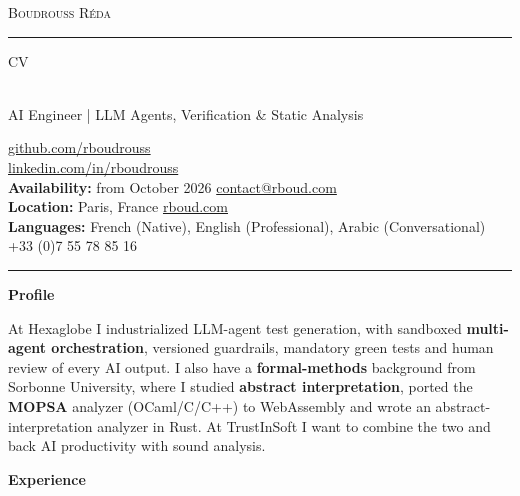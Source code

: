 \documentclass[10pt,A4]{article}
\newcommand{\cvsection}[1]
{
	\begin{center}
		\large\textcolor{sectcol}{\textbf{#1}}
	\end{center}
}
\newcommand{\metasection}[2]
{
\footnotesize{#2} \hspace*{\fill} \footnotesize{#1}\\[1pt]
}
\begin{document}
\pagestyle{fancy}


\vspace{-8pt}
\begin{center}
    {\HUGE \textsc{Boudrouss Réda} \textcolor{sectcol}{\rule[-1mm]{1mm}{0.9cm}} \textsc{CV}}\\[2pt]
    {\small AI Engineer | LLM Agents, Verification \& Static Analysis}
\end{center}

\vspace{6pt}

\metasection{\href{https://github.com/rboudrouss}{github.com/rboudrouss}}{}
\metasection{\href{https://www.linkedin.com/in/rboudrouss}{linkedin.com/in/rboudrouss}}{}
\metasection{\href{mailto:contact@rboud.com}{contact@rboud.com}}{\textbf{Availability:} from October 2026}
\metasection{\href{https://rboud.com}{rboud.com}}{\textbf{Location:} Paris, France}
\metasection{+33 (0)7 55 78 85 16}{\textbf{Languages:} French (Native), English (Professional), Arabic (Conversational)}

\vspace{-15pt}
\textcolor{softcol}{\hrule}

\normalsize

\cvsection{Profile}
At Hexaglobe I industrialized LLM-agent test generation, with sandboxed \textbf{multi-agent orchestration}, versioned guardrails, mandatory green tests and human review of every AI output. I also have a \textbf{formal-methods} background from Sorbonne University, where I studied \textbf{abstract interpretation}, ported the \textbf{MOPSA} analyzer (OCaml/C/C++) to WebAssembly and wrote an abstract-interpretation analyzer in Rust. At TrustInSoft I want to combine the two and back AI productivity with sound analysis.

\vspace{-8pt}
\cvsection{Experience}
\end{document}
